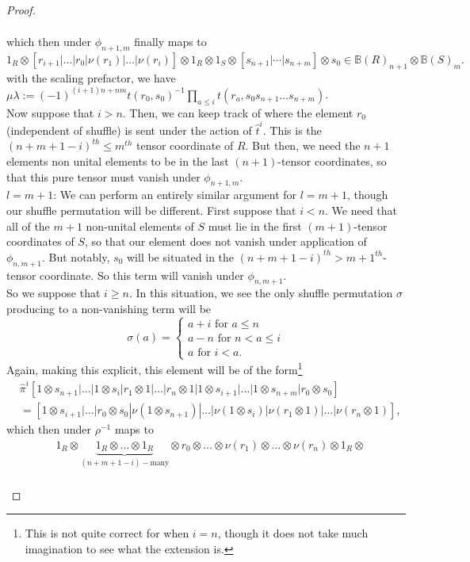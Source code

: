 \documentclass{article}
\newcommand{\els}{[s_{n+1} | \cdots |s_{n+m}]}
\theoremstyle{plain}
\theoremstyle{definition}
\begin{document}
\begin{proof}
\begin{pfparts}
$$\begin{aligned}
\end{aligned}$$
which then under $\phi_{n+1, m}$ finally maps to
$$1_R \otimes [r_{i+1} | \ldots | r_0 | \nu(r_1) | \ldots | \nu(r_i) ] \otimes 1_R \otimes 1_S \otimes \els \otimes s_0 \in \mathbb{B}(R)_{n+1} \otimes \mathbb{B}(S)_m.$$
with the scaling prefactor, we have $\mu\lambda:=(-1)^{(i+1)n + nm}t(r_0,s_0)^{-1}\prod_{a\leq i} t(r_a,s_0 s_{n+1}\ldots s_{n+m})$.\\[5pt]
Now suppose that $i>n$. Then, we can keep track of where the element $r_0$ (independent of shuffle) is sent under the action of $\hat{t}^i$. This is the $(n+m+1-i)^{th}\leq m^{th}$ tensor coordinate of $R$. But then, we need the $n+1$ elements non unital elements to be in the last $(n+1)$-tensor coordinates, so that this pure tensor must vanish under $\phi_{n+1,m}$. \\[5pt]
$l=m+1$: We can perform an entirely similar argument for $l=m+1$, though our shuffle permutation will be different. First suppose that $i < n$. We need that all of the $m+1$ non-unital elements of $S$ must lie in the first $(m+1)$-tensor coordinates of $S$, so that our element does not vanish under application of $\phi_{n,m+1}$. But notably, $s_0$ will be situated in the $(n+m+1-i)^{th} > m+1^{th}$-tensor coordinate. So this term will vanish under $\phi_{n,m+1}$. \\
So we suppose that $i \geq n$. In this situation, we see the only shuffle permutation $\sigma$ producing to a non-vanishing term will be
$$\sigma(a) = \begin{cases} a+i \textrm{ for } a \leq n \\ a-n \textrm{ for }  n < a \leq i\\ a \textrm{ for } i<a. \end{cases}$$
Again, making this explicit, this element will be of the form\footnote{This is not quite correct for when $i=n$, though it does not take much imagination to see what the extension is.}
$$\begin{aligned} &\hat{\pi}^i[1 \otimes s_{n+1} | \ldots | 1 \otimes s_{i}| r_1 \otimes 1 | \ldots | r_n \otimes 1 | 1 \otimes s_{i+1} | \ldots | 1 \otimes s_{n+m} | r_0 \otimes s_0] \\
&= [1 \otimes s_{i+1} | \ldots | r_0 \otimes s_0 | \nu(1 \otimes s_{n+1}) | \ldots | \nu(1 \otimes s_{i}) | \nu(r_1 \otimes 1) | \ldots | \nu(r_n \otimes 1)], \end{aligned}$$
which then under $\rho^{-1}$ maps to
$$\begin{aligned} & 1_R \otimes \underbrace{1_R \otimes \ldots \otimes 1_R}_{(n+m+1-i)-\textrm{many}} \otimes r_0 \otimes \ldots \otimes \nu(r_{1}) \otimes \ldots \otimes \nu(r_n) \otimes 1_R \otimes \\

\end{aligned}$$
\end{pfparts}
\end{proof}
\end{document}
